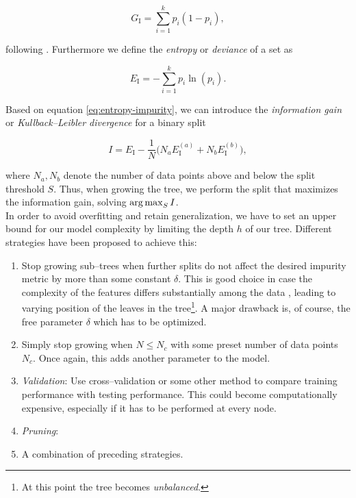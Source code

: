\begin{equation}
\label{eq:gini-impurity}
G_{\text{I}} = \sum\limits_{i=1}^k p_i (1 - p_i),
\end{equation}

following \citet{astroML,hastie2001,ripley2007}. Furthermore we define the \emph{entropy} or \emph{deviance} of a set as

\begin{equation}
\label{eq:entropy-impurity}
E_{\text{I}} = - \sum\limits_{i=1}^k p_i \ln(p_i).
\end{equation}

Based on equation \eqref{eq:entropy-impurity}, we can introduce the \emph{information gain} or \emph{Kullback--Leibler divergence} \citep{kullback1951} for a binary split

\begin{equation}
\label{eq:information-gain}
I = E_{\text{I}} - \frac{1}{N} \big(N_a E_{\text{I}}^{(a)} + N_b E_{\text{I}}^{(b)}\big),
\end{equation}

where $N_a, N_b$ denote the number of data points above and below the split threshold $S$. Thus, when growing the tree, we perform the split that maximizes the information gain, \ie solving $\operatorname*{arg\,max}_S I$.\\


In order to avoid overfitting and retain generalization, we have to set an upper bound for our model complexity by limiting the depth $h$ of our tree. Different strategies have been proposed to achieve this:

\begin{enumerate}
\item \label{itm:constant-metric} Stop growing sub--trees when further splits do not affect the desired impurity metric by more than some constant $\delta$. This is good choice in case the complexity of the features differs substantially among the data \citep{duda2001}, leading to varying position of the leaves in the tree\footnote{At this point the tree becomes \emph{unbalanced}.}. A major drawback is, of course, the free parameter $\delta$ which has to be optimized.
\item \label{itm:constant-data-points} Simply stop growing when $N \le N_c$ with some preset number of data points $N_c$. Once again, this adds another parameter to the model.
\item \label{itm:validation} \emph{Validation}: Use cross--validation or some other method to compare training performance with testing performance. This could become computationally expensive, especially if it has to be performed at every node.
\item \label{itm:pruning} \emph{Pruning}:
\item A combination of preceding strategies.
\end{enumerate}

